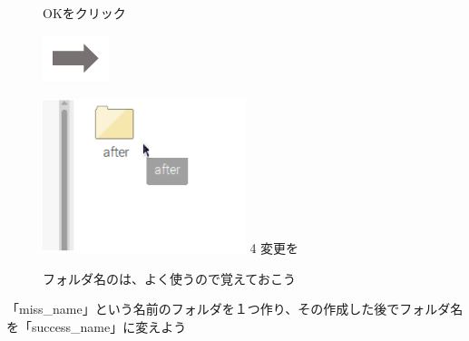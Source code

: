 \documentclass[a4paper,12pt]{jarticle}
\begin{document}
\begin{figure}[ht]
\begin{minipage}{6.973cm}
    OKをクリック
  \end{minipage}
  \includegraphics[width=1.919cm]{textbook-img053.png}
  \begin{minipage}{5.751cm}
    \includegraphics[width=5.92cm]{textbook-img056.png}
    4 変更を
  \end{minipage}
  \centering

  \begin{minipage}{5.751cm}
    フォルダ名のは、よく使うので覚えておこう
  \end{minipage}
\end{figure}


\theQuestion\label{Q:hasAnswer02-3}

「miss\_name」という名前のフォルダを１つ作り、その作成した後でフォルダ名を「success\_name」に変えよう
\end{document}
